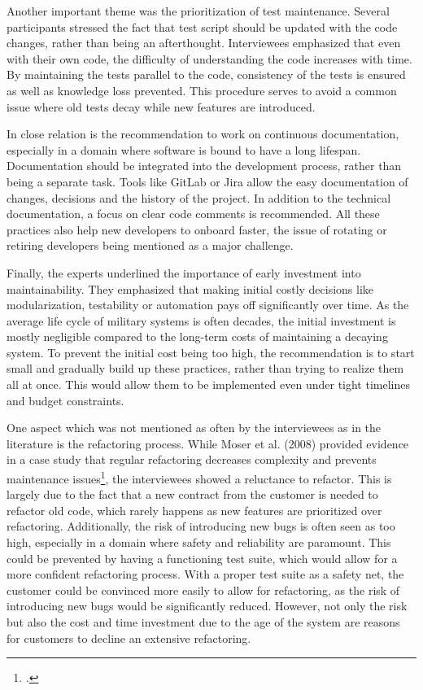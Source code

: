 Another important theme was the prioritization of test maintenance. Several participants stressed the fact that test script should be updated with the code changes, rather than being an afterthought.
Interviewees emphasized that even with their own code, the difficulty of understanding the code increases with time. By maintaining the tests parallel to the code, consistency of the tests is ensured as well as knowledge loss prevented.
This procedure serves to avoid a common issue where old tests decay while new features are introduced.

In close relation is the recommendation to work on continuous documentation, especially in a domain where software is bound to have a long lifespan. Documentation should be integrated into the development process, rather than being a separate task.
Tools like GitLab or Jira allow the easy documentation of changes, decisions and the history of the project. In addition to the technical documentation, a focus on clear code comments is recommended.
All these practices also help new developers to onboard faster, the issue of rotating or retiring developers being mentioned as a major challenge.

Finally, the experts underlined the importance of early investment into maintainability. They emphasized that making initial costly decisions like modularization, testability or automation pays off significantly over time.
As the average life cycle of military systems is often decades, the initial investment is mostly negligible compared to the long-term costs of maintaining a decaying system.
To prevent the initial cost being too high, the recommendation is to start small and gradually build up these practices, rather than trying to realize them all at once. This would allow them to be implemented even under tight timelines and budget constraints.

One aspect which was not mentioned as often by the interviewees as in the literature is the refactoring process. While Moser et al. (2008) provided evidence in a case study that regular refactoring decreases complexity and prevents maintenance issues\footcite[262]{moserCaseStudyImpact2008}, the interviewees showed a reluctance to refactor.
This is largely due to the fact that a new contract from the customer is needed to refactor old code, which rarely happens as new features are prioritized over refactoring. Additionally, the risk of introducing new bugs is often seen as too high, especially in a domain where safety and reliability are paramount.
This could be prevented by having a functioning test suite, which would allow for a more confident refactoring process. With a proper test suite as a safety net, the customer could be convinced more easily to allow for refactoring, as the risk of introducing new bugs would be significantly reduced. However, not only the risk but also the cost and time investment due to the age of the system are reasons for customers to decline an extensive refactoring.

